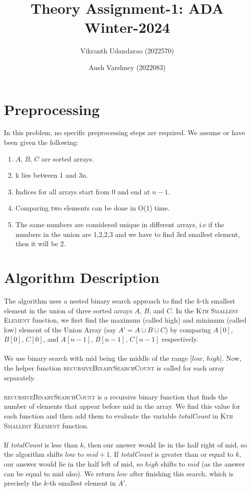 \documentclass{article}
\title{Theory Assignment-1: ADA Winter-2024}
\author{Vikranth Udandarao (2022570) \and Ansh Varshney (2022083)}
\date{}
\begin{document}
\maketitle

\section{Preprocessing}
In this problem, no specific preprocessing steps are required. We assume or have been given the following:
\begin{enumerate}
    \item $A$, $B$, $C$ are sorted arrays.
    \item k lies between 1 and 3n.
    \item Indices for all arrays start from 0 and end at $n-1$.
    \item Comparing two elements can be done in O(1) time.
    \item The same numbers are considered unique in different arrays, i.e if the numbers in the union are 1,2,2,3 and we have to find 3rd smallest element, then it will be 2.
\end{enumerate}

\section{Algorithm Description}
The algorithm uses a nested binary search approach to find the $k$-th smallest element in the union of three sorted arrays $A$, $B$, and $C$. In the \textsc{Kth Smallest Element} function, we first find the maximum (called high) and minimum (called low) element of the Union Array (say $A' = A \cup B \cup C$) by comparing $A[0]$, $B[0]$, $C[0]$, and $A[n-1]$, $B[n-1]$, $C[n-1]$ respectively.
\\\\
We use binary search with mid being the middle of the range [$low$, $high$]. Now, the helper function \textsc{recursiveBinarySearchCount} is called for each array separately.
\\\\
\textsc{recursiveBinarySearchCount} is a recursive binary function that finds the number of elements that appear before mid in the array. We find this value for each function and then add them to evaluate the variable \textit{totalCount} in \textsc{Kth Smallest Element} function.
\\\\
If \textit{totalCount} is less than $k$, then our answer would lie in the half right of mid, so the algorithm shifts $low$ to $mid+1$. If \textit{totalCount} is greater than or equal to $k$, our answer would lie in the half left of mid, so $high$ shifts to $mid$ (as the answer can be equal to mid also). We return $low$ after finishing this search, which is precisely the $k$-th smallest element in $A'$.
\end{document}
